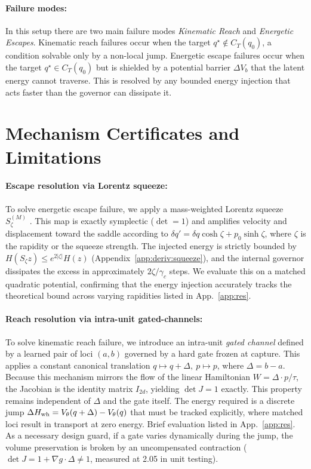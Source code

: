 \documentclass{article}
\newcommand{\detJ}{\det J}
\begin{document}
\paragraph{Failure modes:} In this setup there are two main failure modes \emph{Kinematic Reach} and \emph{Energetic Escapes}. Kinematic reach failures occur when the target $q^\star\notin C_T(q_0)$, a condition solvable only by a non-local jump. Energetic escape failures occur when the target $q^\star\in C_T(q_0)$ but is shielded by a potential barrier $\Delta V_b$ that the latent energy cannot traverse. This is resolved by any bounded energy injection that acts faster than the governor can dissipate it.

\section{Mechanism Certificates and Limitations}
\paragraph{Escape resolution via Lorentz squeeze:}
To solve energetic escape failure, we apply a mass-weighted Lorentz squeeze $S^{(M)}_\zeta$ \citep{wales_global_1997}. This map is exactly symplectic ($\det=1$) and amplifies velocity and displacement toward the saddle according to $\delta q'=\delta q\cosh\zeta+p_0\sinh\zeta$, where $\zeta$ is the rapidity or the squeeze strength. The injected energy is strictly bounded by $H(S_\zeta z)\le e^{2|\zeta|}H(z)$ (Appendix~\ref{app:deriv:squeeze}), and the internal governor dissipates the excess in approximately $2\zeta/\gamma_c$ steps. We evaluate this on a matched quadratic potential, confirming that the energy injection accurately tracks the theoretical bound across varying rapidities listed in App.~\ref{app:res}.

\paragraph{Reach resolution via intra-unit gated-channels:}
To solve kinematic reach failure, we introduce an intra-unit \emph{gated channel} defined by a learned pair of loci $(a,b)$ governed by a hard gate frozen at capture. This applies a constant canonical translation $q\mapsto q+\Delta,\ p\mapsto p$, where $\Delta=b-a$. Because this mechanism mirrors the flow of the linear Hamiltonian $W=\Delta\cdot p/\tau$, the Jacobian is the identity matrix $I_{2d}$, yielding $\detJ=1$ exactly. This property remains independent of $\Delta$ and the gate itself. The energy required is a discrete jump $\Delta H_{\rm wh}=V_\theta(q+\Delta)-V_\theta(q)$ that must be tracked explicitly, where matched loci result in transport at zero energy. Brief evaluation listed in App.~\ref{app:res}. As a necessary design guard, if a gate varies dynamically during the jump, the volume preservation is broken by an uncompensated contraction ($\detJ=1+\nabla g\cdot\Delta\neq1$, measured at 2.05 in unit testing).
\end{document}
